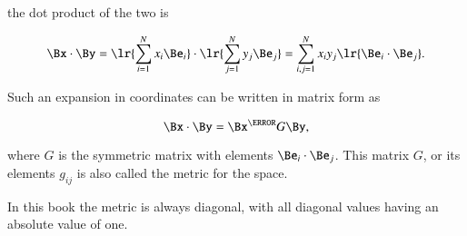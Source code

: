 the dot product of the two is

\begin{dmath}\label{eqn:prerequisites:260}
\Bx \cdot \By
=
   \lr{ \sum_{i = 1}^N x_i \Be_i } \cdot
   \lr{ \sum_{j = 1}^N y_j \Be_j }
=
   \sum_{i,j = 1}^N x_i y_j \lr{ \Be_i \cdot \Be_j }.
\end{dmath}

Such an expansion in coordinates can be written in matrix form as

\begin{dmath}\label{eqn:prerequisites:280}
\Bx \cdot \By
=
\Bx^\T G \By,
\end{dmath}

where \( G \) is the symmetric matrix with elements \( \Be_i \cdot \Be_j \).  This matrix \( G \), or its elements \( g_{ij} \) is also called the metric for the space.

In this book the metric is always diagonal, with all diagonal values having an absolute value of one.




%
%

